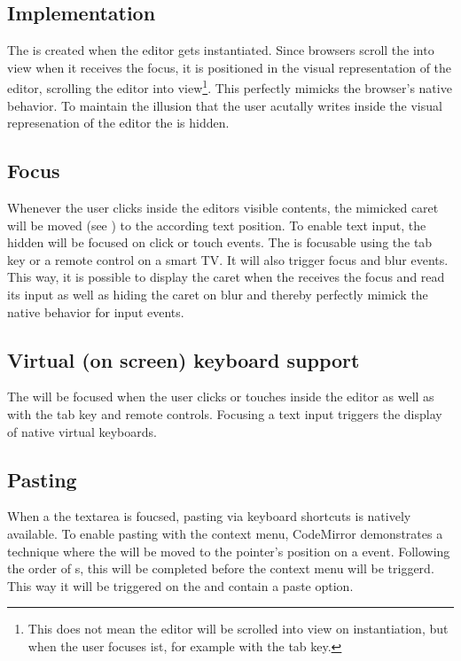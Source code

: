 \subsection{Implementation}

The  is created when the editor gets instantiated. Since browsers scroll the  into view when it receives the focus, it is positioned in the visual representation of the editor, scrolling the editor into view\footnote{This does not mean the editor will be scrolled into view on instantiation, but when the user focuses ist, for example with the tab key.}. This perfectly mimicks the browser's native behavior. To maintain the illusion that the user acutally writes inside the visual represenation of the editor the  is hidden.

\subsection{Focus} Whenever the user clicks inside the editors visible contents, the mimicked caret will be moved (see ) to the according text position. To enable text input, the hidden  will be focused on click or touch events. The  is focusable using the tab key or a remote control on a smart TV. It will also trigger focus and blur events. This way, it is possible to display the caret when the  receives the focus and read its input as well as hiding the caret on blur and thereby perfectly mimick the native behavior for input events.

\subsection{Virtual (on screen) keyboard support} The  will be focused when the user clicks or touches inside the editor as well as with the tab key and remote controls. Focusing a text input triggers the display of native virtual keyboards.

\subsection{Pasting} 
\label{subsec:input_textarea_pasting}

When a the textarea is foucsed, pasting via keyboard shortcuts is natively available. To enable pasting with the context menu, CodeMirror demonstrates a technique where the  will be moved to the pointer's position on a  event. Following the order of s, this will be completed before the context menu will be triggerd. This way it will be triggered on the  and contain a paste option.

